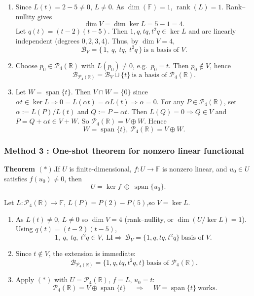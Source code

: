 \documentclass[12pt]{article}
\newcommand{\F}{\mathbb{F}}
\newcommand{\R}{\mathbb{R}}
\newcommand{\Span}{\operatorname{span}}
\newcommand{\Pfour}{\mathcal{P}_4(\R)}
\begin{document}
\begin{enumerate}[label=(\alph*)]
\item Since \(L(t)=2-5\ne 0\), \(L\neq 0\). As \(\dim(\F)=1\), \(\operatorname{rank}(L)=1\). Rank--nullity gives
\[
\dim V=\dim\ker L=5-1=4.
\]
Let \(q(t)=(t-2)(t-5)\). Then \(1,q,tq,t^2q\in \ker L\) and are linearly independent (degrees \(0,2,3,4\)).
Thus, by \(\dim V=4\),
\[
\boxed{\ \mathcal B_V=\{\,1,\ q,\ tq,\ t^2q\,\}\ \text{is a basis of }V.\ }
\]

\item Choose \(p_0\in \Pfour\) with \(L(p_0)\ne 0\), e.g.\ \(p_0=t\). Then \(p_0\notin V\), hence
\[
\boxed{\ \mathcal B_{\Pfour}=\mathcal B_V\cup\{t\}\ \text{is a basis of }\Pfour.\ }
\]

\item Let \(W=\Span\{t\}\). Then \(V\cap W=\{0\}\) since \(\alpha t\in\ker L\Rightarrow 0=L(\alpha t)=\alpha L(t)\Rightarrow \alpha=0\).
For any \(P\in\Pfour\), set \(\alpha:=L(P)/L(t)\) and \(Q:=P-\alpha t\). Then \(L(Q)=0\Rightarrow Q\in V\) and \(P=Q+\alpha t\in V+W\).
So \(\Pfour=V\oplus W\). Hence
\[
\boxed{\ W=\Span\{t\},\ \Pfour=V\oplus W.\ }
\]
\end{enumerate}

\subsubsection{Method 3 : One-shot theorem for nonzero linear functional}
\noindent\textbf{Theorem \((*)\).}\quad If \(U\) is finite-dimensional, \(f:U\to\F\) is nonzero linear, and \(u_0\in U\) satisfies \(f(u_0)\ne 0\), then
\[
U=\ker f\ \oplus\ \Span\{u_0\}.
\]

Let \(L:\Pfour\to\F\), \(L(P)=P(2)-P(5)\),so \(V=\ker L\).

\begin{enumerate}[label=(\alph*)]
\item As \(L(t)\ne 0\), \(L\neq 0\) so \(\dim V=4\) (rank--nullity, or \(\dim(U/\ker L)=1\)). Using \(q(t)=(t-2)(t-5)\),
\[
1,\ q,\ tq,\ t^2q\in V,\ \text{LI} \Rightarrow
\boxed{\ \mathcal B_V=\{1,q,tq,t^2q\}\ \text{basis of }V.\ }
\]

\item Since \(t\notin V\), the extension is immediate:
\[
\boxed{\ \mathcal B_{\Pfour}=\{1,q,tq,t^2q,t\}\ \text{basis of }\Pfour.\ }
\]

\item Apply \((*)\) with \(U=\Pfour\), \(f=L\), \(u_0=t\):
\[
\boxed{\ \Pfour=V\oplus \Span\{t\}\ } \quad\Rightarrow\quad
\boxed{\ W=\Span\{t\}\ \text{works.} }
\]
\end{enumerate}
\end{document}
